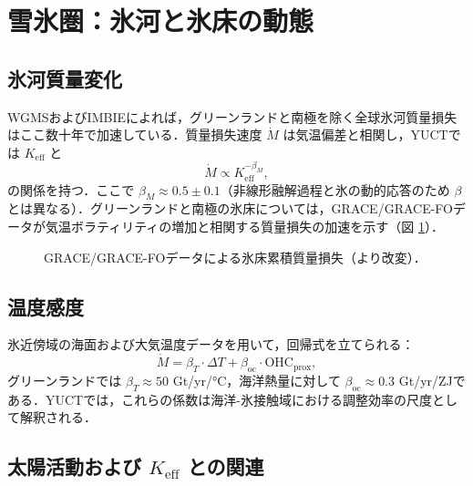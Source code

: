 \documentclass[11pt,a4paper]{article}
\newcommand{\Keff}{K_{\mathrm{eff}}}
\newcommand{\be}{\beta}
\begin{document}
	\section{雪氷圏：氷河と氷床の動態}
	
	\subsection{氷河質量変化}
	
	WGMSおよびIMBIEによれば，グリーンランドと南極を除く全球氷河質量損失はここ数十年で加速している．質量損失速度 $\dot{M}$ は気温偏差と相関し，YUCTでは $\Keff$ と
	\[
	\dot{M} \propto \Keff^{-\beta_M},
	\]
	の関係を持つ．ここで $\beta_M \approx 0.5 \pm 0.1$（非線形融解過程と氷の動的応答のため $\be$ とは異なる）．グリーンランドと南極の氷床については，GRACE/GRACE-FOデータが気温ボラティリティの増加と相関する質量損失の加速を示す（図 \ref{fig:grace}）．
	
	\begin{figure}[htbp]
		\centering
		\caption{GRACE/GRACE-FOデータによる氷床累積質量損失（\cite{IMBIE}より改変）．}
		\label{fig:grace}
	\end{figure}
	
	\subsection{温度感度}
	
	氷近傍域の海面および大気温度データを用いて，回帰式を立てられる：
	\[
	\dot{M} = \beta_T \cdot \Delta T + \beta_{\text{oc}} \cdot \text{OHC}_{\text{prox}},
	\]
	グリーンランドでは $\beta_T \approx 50$ Gt/yr/°C，海洋熱量に対して $\beta_{\text{oc}} \approx 0.3$ Gt/yr/ZJである．YUCTでは，これらの係数は海洋-氷接触域における調整効率の尺度として解釈される．
	
	\subsection{太陽活動および $\Keff$ との関連}
	
\end{document}
